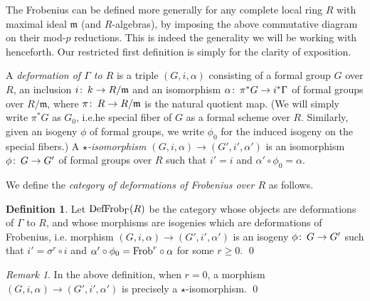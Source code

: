 \documentclass{gtpart}
\theoremstyle{definition}
\newtheorem{defn}[thm]{Definition}
\theoremstyle{remark}
\newtheorem{rmk}[thm]{Remark}
\def\co{\colon\thinspace}
\newcommand{\mf}[1]{\mathfrak{#1}}
\newcommand{\Frob}{{\rm Frob}}
\newcommand{\DF}{{{\rm DefFrob}_\Gamma}}
\begin{document}
The Frobenius can be defined more generally for any complete local ring $R$ 
with maximal ideal $\mf m$ (and $R$-algebras), by imposing the above 
commutative diagram on their mod-$p$ reductions.  This is indeed the 
generality we will be working with henceforth.  Our restricted first 
definition is simply for the clarity of exposition.  

A {\em deformation of $\Gamma$ to $R$} is a triple $(G,i,\alpha)$ consisting 
of a formal group $G$ over $R$, an inclusion $i\co k \to R/\mf m$ and an 
isomorphism $\alpha\co \pi^*G \to i^*\Gamma$ of formal groups over $R/\mf m$, 
where $\pi\co R \to R/\mf m$ is the natural quotient map.  (We will simply 
write $\pi^*G$ as $G_0$, i.e.he special fiber of $G$ as a formal 
scheme over $R$.  Similarly, given an isogeny $\phi$ of formal groups, we 
write $\phi_0$ for the induced isogeny on the special fibers.)  A {\em 
$\star$-isomorphism $(G,i,\alpha) \to (G',i',\alpha')$} is an isomorphism 
$\phi\co G \to G'$ of formal groups over $R$ such that $i' = i$ and 
$\alpha' \circ \phi_0 = \alpha$.  

We define the {\em category of deformations of Frobenius over $R$} as follows.  
\begin{defn}
 Let $\DF(R)$ be the category whose objects are deformations of $\Gamma$ to 
 $R$, and whose morphisms are isogenies which are deformations of Frobenius, 
 i.e. morphism $(G,i,\alpha) \to (G',i',\alpha')$ is an isogeny 
 $\phi\co G \to G'$ such that $i' = \sigma^r \circ i$ and 
 $\alpha' \circ \phi_0 = \Frob^r \circ \alpha$ for some $r \ge 0$.  \qed
\end{defn}
\begin{rmk}
\label{rmk:star}
 In the above definition, when $r = 0$, a morphism 
 $(G,i,\alpha) \to (G',i',\alpha')$ is precisely a $\star$-isomorphism.  \qed
\end{rmk}
\end{document}
